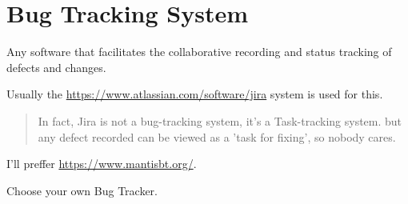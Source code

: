 \section{Bug Tracking System}
\label{sec:Bug Tracking System}

Any software that facilitates the collaborative recording and status tracking of defects and changes.

Usually the \url{https://www.atlassian.com/software/jira} system is used for this.

\begin{quote}
In fact, Jira is not a bug-tracking system, it's a Task-tracking system. but any defect recorded can be viewed as a 'task for fixing', so nobody cares.                                                                                                                                                       \end{quote} 

I'll preffer \url{https://www.mantisbt.org/}.

Choose your own Bug Tracker.